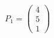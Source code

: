 \documentclass[preview]{standalone}
\begin{document}
\begin{align*}
P_1=\begin{pmatrix}4\\5\\1\end{pmatrix}
\end{align*}
\end{document}
